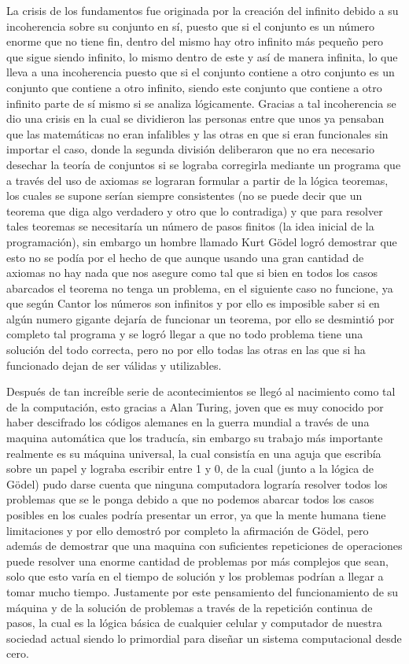 \documentclass[a4paper,12pt]{article}
\theoremstyle{definition}
\begin{document}
La crisis de los fundamentos fue originada por la creación del infinito debido a su incoherencia sobre su conjunto en sí, puesto que si el conjunto es un número enorme que no tiene fin, dentro del mismo hay otro infinito más pequeño pero que sigue siendo infinito, lo mismo dentro de este y así de manera infinita, lo que lleva a una incoherencia puesto que si el conjunto contiene a otro conjunto es un conjunto que contiene a otro infinito, siendo este conjunto que contiene a otro infinito parte de sí mismo si se analiza lógicamente. Gracias a tal incoherencia se dio una crisis en la cual se dividieron las personas entre que unos ya pensaban que las matemáticas no eran infalibles y las otras en que si eran funcionales sin importar el caso, donde la segunda división deliberaron que no era necesario desechar la teoría de conjuntos si se lograba corregirla mediante un programa que a través del uso de axiomas se lograran formular a partir de la lógica teoremas, los cuales se supone serían siempre consistentes (no se puede decir que un teorema que diga algo verdadero y otro que lo contradiga) y que para resolver tales teoremas se necesitaría un número de pasos finitos (la idea inicial de la programación), sin embargo un hombre llamado Kurt Gödel logró demostrar que esto no se podía por el hecho de que aunque usando una gran cantidad de axiomas no hay nada que nos asegure como tal que si bien en todos los casos abarcados el teorema no tenga un problema, en el siguiente caso no funcione, ya que según Cantor los números son infinitos y por ello es imposible saber si en algún numero gigante dejaría de funcionar un teorema, por ello se desmintió por completo tal programa y se logró llegar a que no todo problema tiene una solución del todo correcta, pero no por ello todas las otras en las que si ha funcionado dejan de ser válidas y utilizables.

Después de tan increíble serie de acontecimientos se llegó al nacimiento como tal de la computación, esto gracias a Alan Turing, joven que es muy conocido por haber descifrado los códigos alemanes en la guerra mundial a través de una maquina automática que los traducía, sin embargo su trabajo más importante realmente es su máquina universal, la cual consistía en una aguja que escribía sobre un papel y lograba escribir entre 1 y 0, de la cual (junto a la lógica de Gödel) pudo darse cuenta que ninguna computadora lograría resolver todos los problemas que se le ponga debido a que no podemos abarcar todos los casos posibles en los cuales podría presentar un error, ya que la mente humana tiene limitaciones y por ello demostró por completo la afirmación de Gödel, pero además de demostrar que una maquina con suficientes repeticiones de operaciones puede resolver una enorme cantidad de problemas por más complejos que sean, solo que esto varía en el tiempo de solución y los problemas podrían a llegar a tomar mucho tiempo. Justamente por este pensamiento del funcionamiento de su máquina y de la solución de problemas a través de la repetición continua de pasos, la cual es la lógica básica de cualquier celular y computador de nuestra sociedad actual siendo lo primordial para diseñar un sistema computacional desde cero.
\end{document}
